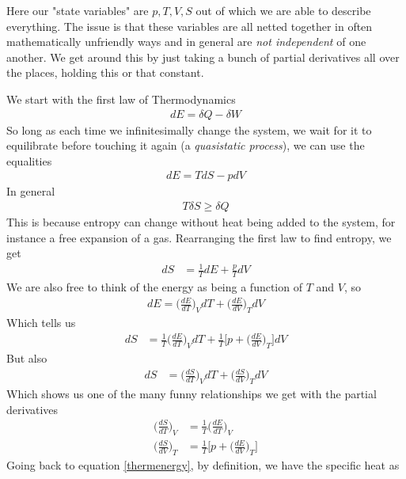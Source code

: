 Here our "state variables" are $p,T,V,S$ out of which we are able to describe everything. %
The issue is that these variables  are all netted together in often mathematically unfriendly ways and in general are \emph{not independent} of one another. We get around this by just taking a bunch of partial derivatives all over the places, holding this or that constant.

We start with the first law of Thermodynamics
\begin{align}
dE = \delta Q - \delta W
\end{align}
So long as each time we infinitesimally change the system, we wait for it to equilibrate before touching it again (a \emph{quasistatic process}),  we can use the equalities
\begin{align}
dE = TdS - p dV
\end{align}
In general
\begin{align}
T\delta S \ge \delta Q
\end{align}
This is because entropy can change without heat being added to the system, for instance a free expansion of a gas. Rearranging the first law to find entropy, we get
\begin{align}
dS &= \frac{1}{T}dE +\frac{p}{T}dV
\end{align}
We are also free to think of the energy as being a function of $T$ and $V$, so
\begin{align}\label{thermenergy}
dE = \Big(\frac{dE}{dT}\Big)_VdT + \Big(\frac{dE}{dV}\Big)_TdV
\end{align}
Which tells us
\begin{align}
dS &= \frac{1}{T}\Big(\frac{dE}{dT}\Big)_VdT + \frac{1}{T}\Big[p + \Big(\frac{dE}{dV}\Big)_T\Big]dV
\end{align}
But also
\begin{align}
dS &= \Big(\frac{dS}{dT}\Big)_V dT + \Big(\frac{dS}{dV}\Big)_T dV
\end{align}
Which shows us one of the many funny relationships we get with the partial derivatives
\begin{align}
 \Big(\frac{dS}{dT}\Big)_V &= \frac{1}{T}\Big(\frac{dE}{dT}\Big)_V\\
\Big(\frac{dS}{dV}\Big)_T &= \frac{1}{T}\Big[p + \Big(\frac{dE}{dV}\Big)_T\Big]\label{partialentropy}
\end{align}
Going back to equation \ref{thermenergy}, by definition, we have the specific heat as
